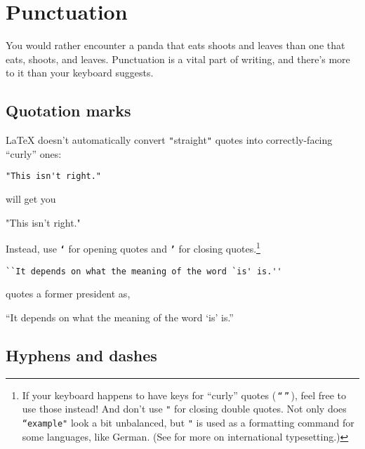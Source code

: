 \chapter{Punctuation}
\label{punctuation}

You would rather encounter a panda that eats
shoots and leaves than one that eats, shoots,
and leaves.\punckern{}
Punctuation is a vital part of writing,
and there's more to it than your keyboard suggests.

\section{Quotation marks}

\LaTeX{} doesn't automatically convert \texttt{"}straight\texttt{"} quotes
into correctly-facing ``curly'' ones:
\begin{leftfigure}
\begin{lstlisting}
"This isn't right."
\end{lstlisting}
\end{leftfigure}
will get you
\begin{leftfigure}
\lm%
"This isn't right."
\end{leftfigure}
Instead, use \texttt{\bfseries `} for opening quotes and \texttt{\bfseries '} for closing
quotes.\punckern\footnote{If your keyboard happens to have keys for
``curly'' quotes (\,\texttt{“}\,\texttt{”}\,), feel free to use those instead!
And don't use \texttt{"} for closing double quotes.
Not only does \texttt{``example"} look a bit unbalanced,
but \texttt{"} is used as a formatting command for some languages,
like German.
(See  for more on international typesetting.)}
\begin{leftfigure}
\begin{lstlisting}
``It depends on what the meaning of the word `is' is.''
\end{lstlisting}
\end{leftfigure}
quotes a former  president as,
\begin{leftfigure}
\lm%
``It depends on what the meaning of the word `is' is.''
\end{leftfigure}

\section{Hyphens and dashes}

